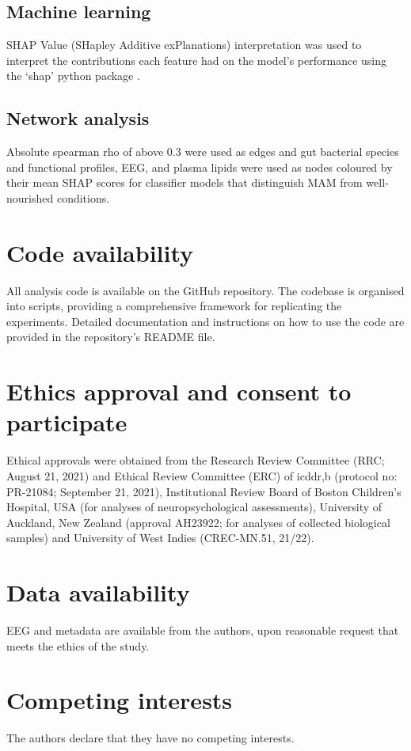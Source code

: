 \documentclass{article}
\begin{document}
\subsection{Machine learning}
SHAP Value (SHapley Additive exPlanations) interpretation was used to interpret the contributions each feature had on the model's performance using the ‘shap’ python package \cite{lundberg2017unified}.

\subsection{Network analysis}
Absolute spearman rho of above 0.3 were used as edges and gut bacterial species and functional profiles, EEG, and plasma lipids were used as nodes coloured by their mean SHAP scores for classifier models that distinguish MAM from well-nourished conditions.

\section{Code availability}
All analysis code is available on the GitHub repository.
The codebase is organised into scripts, providing a comprehensive framework for replicating the experiments.
Detailed documentation and instructions on how to use the code are provided in the repository's README file.

\section{Ethics approval and consent to participate}
Ethical approvals were obtained from the Research Review Committee (RRC; August 21, 2021) and Ethical Review Committee (ERC) of icddr,b (protocol no: PR-21084; September 21, 2021), Institutional Review Board of Boston Children’s Hospital, USA (for analyses of neuropsychological assessments), University of Auckland, New Zealand (approval AH23922; for analyses of collected biological samples) and University of West Indies (CREC-MN.51, 21/22).

\section{Data availability}
EEG and metadata are available from the authors, upon reasonable request that meets the ethics of the study.

\section{Competing interests}
The authors declare that they have no competing interests.
\end{document}
